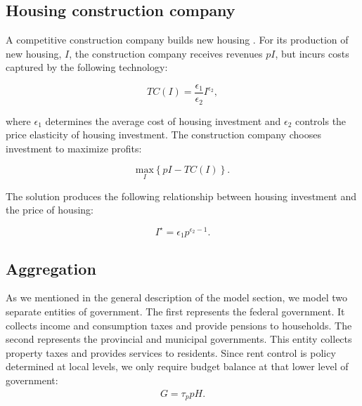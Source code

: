 \documentclass[parskip=full]{article}
\begin{document}
\subsection{Housing construction company}\label{sec:construction_company}

A competitive construction company builds new housing \citep{rotberg-2022}. For its production of new housing, $I$, the construction company receives revenues $pI$, but incurs costs captured by the following technology:

\begin{equation*}
TC(I)=\frac{\epsilon_{1}}{\epsilon_{2}}I^{\epsilon_{2}}\label{eq:total_cost_structure},
\end{equation*}

\noindent where $\epsilon_{1}$ determines the average cost of housing investment and $\epsilon_{2}$ controls the price elasticity of housing investment. The construction company chooses investment to maximize profits:

\begin{equation*}
\label{eq:construction_company_profits}
\underset{I} {\text{$\mbox{max}$}}{\left\{p I-TC(I)\right\}}.
\end{equation*}

\noindent The solution produces the following relationship between housing investment and the price of housing:

\begin{equation}
\label{eq:construction_company_first_order_condition}
I^{\star}=\epsilon_{1} p^{\epsilon_{2}-1}.
\end{equation}

\subsection{Aggregation}\label{subsection:aggregation}

As we mentioned in the general description of the model section, we model two separate entities of government. The first represents the federal government. It collects income and consumption taxes and provide pensions to households. The second represents the provincial and municipal governments. This entity collects property taxes and provides services to residents. Since rent control is policy determined at local levels, we only require budget balance at that lower level of government:
\begin{align}\label{eq:gbc}
  G  = \tau_{p} p H.
\end{align}
\end{document}
